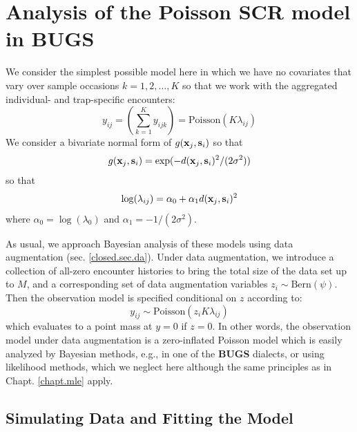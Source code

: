 \section{Analysis of the Poisson SCR model in BUGS}

We consider the simplest possible model here in which we have no
covariates that vary over sample occasions  $k=1,2,\ldots,K$ 
so that we work with
the aggregated individual- and trap-specific encounters:
\[
y_{ij} = (\sum_{k=1}^{K} y_{ijk}) =  \mbox{Poisson}(K  \lambda_{ij})
\]
We consider a bivariate normal form of $g({\bf x}_{j},{\bf s}_{i})$ so
that
\[
g({\bf x}_{j},{\bf s}_{i}) = \exp( -d({\bf x}_{j}, {\bf
  s}_{i})^{2} /(2\sigma^{2}))
\]
so that 
\[
\log( \lambda_{ij})  =\alpha_{0} + \alpha_{1} d({\bf x}_{j}, {\bf s}_{i})^2
\]
where $\alpha_{0} = \log(\lambda_{0})$ and $\alpha_1 = -1/(2\sigma^2)$.


As usual, we approach Bayesian analysis of these
models using data augmentation (sec. \ref{closed.sec.da}).
Under data augmentation, we introduce a collection of all-zero encounter
histories to bring the total size of the data set up to $M$, and a corresponding
set of data augmentation variables $z_{i} \sim \mbox{Bern}(\psi)$. Then
the observation model is specified conditional on $z$ according to:
\[
y_{ij} \sim  \mbox{Poisson}(z_{i} K  \lambda_{ij})
\]
which evaluates to a point mass at $y=0$ if $z=0$.  In other words, the
observation model under data augmentation is a zero-inflated Poisson
model which is easily analyzed by Bayesian methods, e.g., in one of
the {\bf BUGS}
dialects, or  using likelihood methods, which we neglect here although
the same principles as in Chapt. \ref{chapt.mle} apply.


\subsection{Simulating Data and Fitting the Model}


